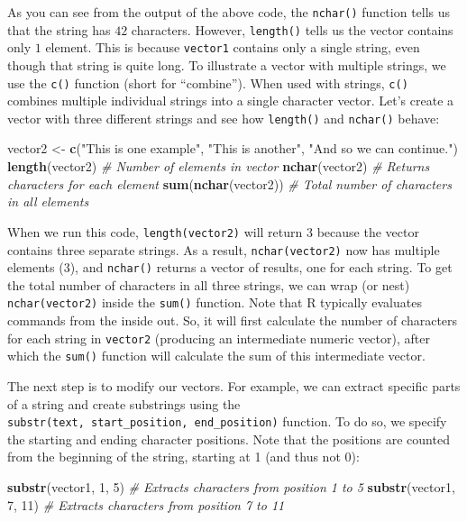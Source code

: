 \documentclass[
]{book}
\newenvironment{Shaded}{\begin{snugshade}}{\end{snugshade}}
\newcommand{\CommentTok}[1]{\textcolor[rgb]{0.56,0.35,0.01}{\textit{#1}}}
\newcommand{\DecValTok}[1]{\textcolor[rgb]{0.00,0.00,0.81}{#1}}
\newcommand{\FunctionTok}[1]{\textcolor[rgb]{0.13,0.29,0.53}{\textbf{#1}}}
\newcommand{\NormalTok}[1]{#1}
\newcommand{\OtherTok}[1]{\textcolor[rgb]{0.56,0.35,0.01}{#1}}
\newcommand{\StringTok}[1]{\textcolor[rgb]{0.31,0.60,0.02}{#1}}
\begin{document}
As you can see from the output of the above code, the \texttt{nchar()} function tells us that the string has \(42\) characters. However, \texttt{length()} tells us the vector contains only \(1\) element. This is because \texttt{vector1} contains only a single string, even though that string is quite long. To illustrate a vector with multiple strings, we use the \texttt{c()} function (short for ``combine''). When used with strings, \texttt{c()} combines multiple individual strings into a single character vector. Let's create a vector with three different strings and see how \texttt{length()} and \texttt{nchar()} behave:

\begin{Shaded}
\begin{Highlighting}[]
\NormalTok{vector2 }\OtherTok{\textless{}{-}} \FunctionTok{c}\NormalTok{(}\StringTok{"This is one example"}\NormalTok{, }\StringTok{"This is another"}\NormalTok{, }\StringTok{"And so we can continue."}\NormalTok{)}
\FunctionTok{length}\NormalTok{(vector2)  }\CommentTok{\# Number of elements in vector}
\FunctionTok{nchar}\NormalTok{(vector2)  }\CommentTok{\# Returns characters for each element}
\FunctionTok{sum}\NormalTok{(}\FunctionTok{nchar}\NormalTok{(vector2))  }\CommentTok{\# Total number of characters in all elements}
\end{Highlighting}
\end{Shaded}

When we run this code, \texttt{length(vector2)} will return \(3\) because the vector contains three separate strings. As a result, \texttt{nchar(vector2)} now has multiple elements (3), and \texttt{nchar()} returns a vector of results, one for each string. To get the total number of characters in all three strings, we can wrap (or nest) \texttt{nchar(vector2)} inside the \texttt{sum()} function. Note that R typically evaluates commands from the inside out. So, it will first calculate the number of characters for each string in \texttt{vector2} (producing an intermediate numeric vector), after which the \texttt{sum()} function will calculate the sum of this intermediate vector.

The next step is to modify our vectors. For example, we can extract specific parts of a string and create substrings using the \texttt{substr(text,\ start\_position,\ end\_position)} function. To do so, we specify the starting and ending character positions. Note that the positions are counted from the beginning of the string, starting at 1 (and thus not 0):

\begin{Shaded}
\begin{Highlighting}[]
\FunctionTok{substr}\NormalTok{(vector1, }\DecValTok{1}\NormalTok{, }\DecValTok{5}\NormalTok{)  }\CommentTok{\# Extracts characters from position 1 to 5}
\FunctionTok{substr}\NormalTok{(vector1, }\DecValTok{7}\NormalTok{, }\DecValTok{11}\NormalTok{)  }\CommentTok{\# Extracts characters from position 7 to 11}
\end{Highlighting}
\end{Shaded}
\end{document}
